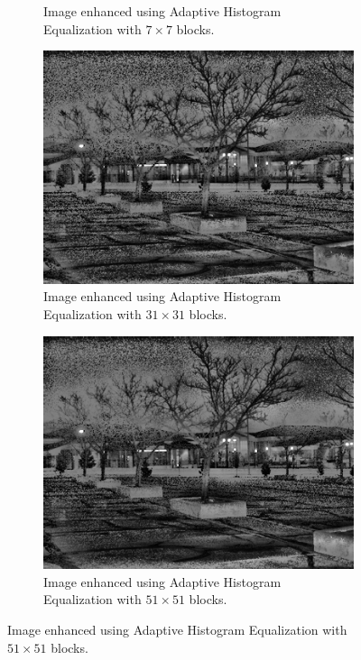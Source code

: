 \documentclass[a4paper, landscape]{article}
\begin{document}
\begin{figure}
\begin{subfigure}{0.32\linewidth}
        \caption{Image enhanced using Adaptive Histogram Equalization with $7\times 7$ blocks.}
    \end{subfigure}
    \begin{subfigure}{0.32\linewidth}
        \centering
        \includegraphics[width=\linewidth]{medium_enhanced_LC1.png}
        \caption{Image enhanced using Adaptive Histogram Equalization with $31\times 31$ blocks.}
    \end{subfigure}
    \centering
    \begin{subfigure}{0.32\linewidth}
        \centering
        \includegraphics[width=\linewidth]{big_enhanced_LC1.png}
        \caption{Image enhanced using Adaptive Histogram Equalization with $51\times 51$ blocks.}

\end{subfigure}
\end{figure}
\end{document}
